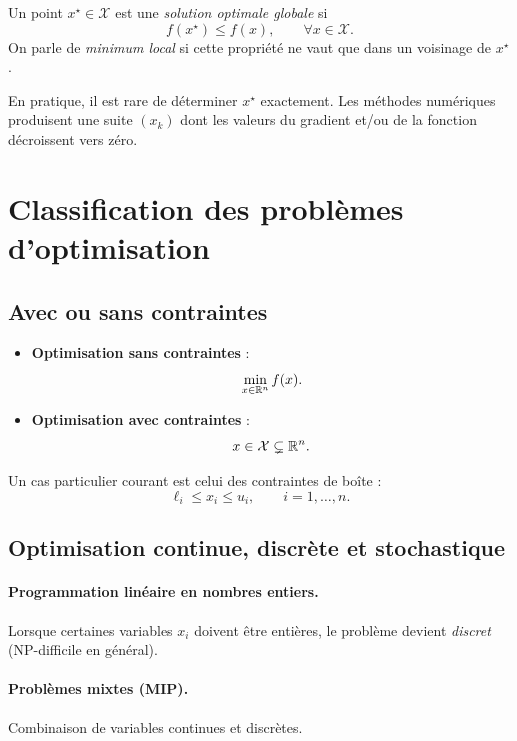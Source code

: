 \begin{definition}
Un point $x^\star \in \mathcal{X}$ est une \emph{solution optimale globale} si
\[
f(x^\star) \le f(x), \qquad \forall x \in \mathcal{X}.
\]
On parle de \emph{minimum local} si cette propriété ne vaut que dans un voisinage de $x^\star$.
\end{definition}

\begin{remarque}
En pratique, il est rare de déterminer $x^\star$ exactement.
Les méthodes numériques produisent une suite $(x_k)$ dont les valeurs du gradient
et/ou de la fonction décroissent vers zéro.
\end{remarque}

\section{Classification des problèmes d'optimisation}

\subsection{Avec ou sans contraintes}

\begin{itemize}
  \item \textbf{Optimisation sans contraintes} :  
  \[
  \min_{x\in\mathbb{R}^n} f(x).
  \]

  \item \textbf{Optimisation avec contraintes} :  
  \[
  x \in \mathcal{X} \subsetneq \mathbb{R}^n.
  \]
\end{itemize}

Un cas particulier courant est celui des contraintes de boîte :
\[
\ell_i \le x_i \le u_i, \qquad i=1,\dots,n.
\]

\subsection{Optimisation continue, discrète et stochastique}

\paragraph{Programmation linéaire en nombres entiers.}
Lorsque certaines variables $x_i$ doivent être entières, le problème devient
\emph{discret} (NP-difficile en général).

\paragraph{Problèmes mixtes (MIP).}
Combinaison de variables continues et discrètes.


